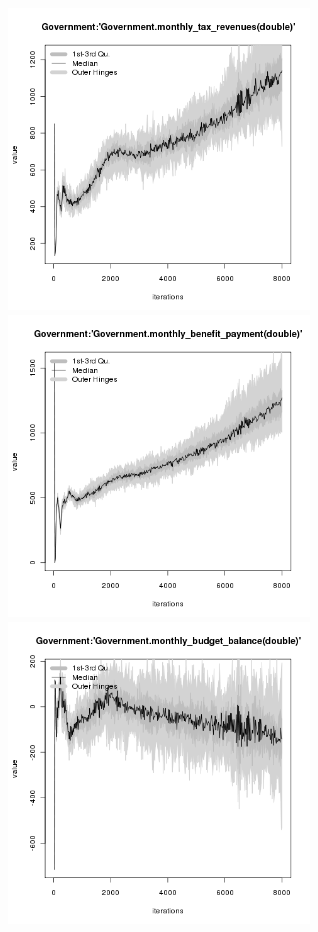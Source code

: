 \begin{figure}[H!]
\centering\leavevmode
\begin{minipage}{17cm}
\centering\leavevmode
\includegraphics[width=8cm]{./benchmark_plots/Government-monthly_tax_revenues.png}
\includegraphics[width=8cm]{./benchmark_plots/Government-monthly_benefit_payment.png}\\
\includegraphics[width=8cm]{./benchmark_plots/Government-monthly_budget_balance.png}

\end{minipage}
\end{figure}
